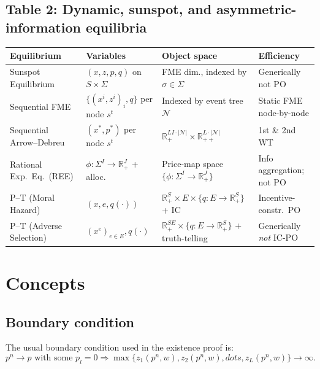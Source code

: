 \subsection*{Table 2: Dynamic, sunspot, and asymmetric-information equilibria}

\renewcommand{\arraystretch}{1.3}
\setlength{\tabcolsep}{5pt}
\small
\noindent\begin{tabularx}{\textwidth}{|>{\raggedright\arraybackslash}p{3cm}|>{\raggedright\arraybackslash}p{2.8cm}|>{\raggedright\arraybackslash}X|>{\raggedright\arraybackslash}p{3.4cm}|}
\hline
\textbf{Equilibrium} & \textbf{Variables} & \textbf{Object space} & \textbf{Efficiency} \\
\hline

Sunspot Equilibrium & $(x, z, p, q)$ on $S \times \Sigma$ & FME dim., indexed by $\sigma \in \Sigma$ & Generically not PO \\
\hline

Sequential FME & $\{(x^i, z^i)_i, q\}$ per node $s^t$ & Indexed by event tree $\mathcal{N}$ & Static FME node-by-node \\
\hline

Sequential Arrow--Debreu & $(x^*, p^*)$ per node $s^t$ & $\mathbb{R}_+^{LI \cdot |\mathcal{N}|} \times \mathbb{R}_{++}^{L \cdot |\mathcal{N}|}$ & 1st \& 2nd WT \\
\hline

Rational Exp.\ Eq.\ (REE) & $\phi: \Sigma^I \to \mathbb{R}_+^J$ + alloc. & Price-map space $\{\phi: \Sigma^I \to \mathbb{R}_+^J\}$ & Info aggregation; not PO \\
\hline

P--T (Moral Hazard) & $(x, e, q(\cdot))$ & $\mathbb{R}_+^S \times E \times \{q: E \to \mathbb{R}_+^S\}$ + IC & Incentive-constr.\ PO \\
\hline

P--T (Adverse Selection) & $(x^e)_{e \in E}, q(\cdot)$ & $\mathbb{R}_+^{SE} \times \{q: E \to \mathbb{R}_+^S\}$ + truth-telling & Generically \emph{not} IC-PO \\
\hline
\end{tabularx}

\section{Concepts}

\subsection{Boundary condition}
The usual boundary condition used in the existence proof is:
\[
p^n \rightarrow p \text{ with some } p_l = 0 \Rightarrow \max \{z_1(p^n, w), z_2(p^n, w), 
dots, z_L(p^n, w) \} \rightarrow \infty.
\]

